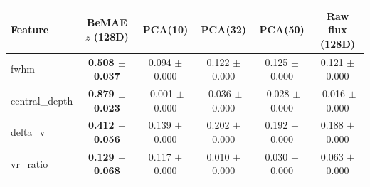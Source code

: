 \begin{tabular}{lccccc}
  \toprule
  Feature & BeMAE $z$ (128D) & PCA(10) & PCA(32) & PCA(50) & Raw flux (128D) \\
  \midrule
  fwhm                 & \textbf{0.508 $\pm$ 0.037} & 0.094 $\pm$ 0.000 & 0.122 $\pm$ 0.000 & 0.125 $\pm$ 0.000 & 0.121 $\pm$ 0.000 \\
  central\_depth       & \textbf{0.879 $\pm$ 0.023} & -0.001 $\pm$ 0.000 & -0.036 $\pm$ 0.000 & -0.028 $\pm$ 0.000 & -0.016 $\pm$ 0.000 \\
  delta\_v             & \textbf{0.412 $\pm$ 0.056} & 0.139 $\pm$ 0.000 & 0.202 $\pm$ 0.000 & 0.192 $\pm$ 0.000 & 0.188 $\pm$ 0.000 \\
  vr\_ratio            & \textbf{0.129 $\pm$ 0.068} & 0.117 $\pm$ 0.000 & 0.010 $\pm$ 0.000 & 0.030 $\pm$ 0.000 & 0.063 $\pm$ 0.000 \\
  \bottomrule
\end{tabular}
